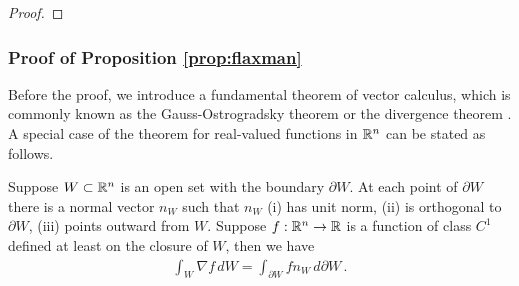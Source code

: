 \begin{proof}
\end{proof}


\subsubsection*{Proof of Proposition \ref{prop:flaxman}}
Before the proof, we introduce a fundamental theorem of vector calculus, which is commonly known as the Gauss-Ostrogradsky theorem or the divergence theorem . A special case of the theorem for real-valued functions in $\mathbb{R}^n$ can be stated as follows.
\begin{lemma}
\label{lem:gradientCalculus}
Suppose $W \subset \mathbb{R}^n$ is an open set with the boundary $\partial W$. At each point of $\partial W$ there is a normal vector $n_W$ such that $n_W$  (i) has unit norm, (ii) is orthogonal to $\partial W$, (iii) points outward from $W$. Suppose $f: \mathbb{R}^n\to \mathbb{R}$ is a function of class $C^1$ defined at least on the closure of $W$, then we have
\begin{align*}
\int_{ W} \nabla f\,d W = \int_{\partial W} f n_W \,d \partial W \,.
\end{align*}
\end{lemma}

